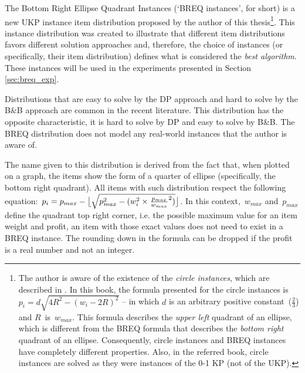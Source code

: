 The Bottom Right Ellipse Quadrant Instances (`BREQ instances', for short) is a new UKP instance item distribution proposed by the author of this thesis\footnote{The author is aware of the existence of the \emph{circle instances}, which are described in \cite[p. 158]{book_ukp_2004}. In this book, the formula presented for the circle instances is \(p_i = d\sqrt{4R^2 - (w_i - 2R)^2}\) -- in which \(d\) is an arbitrary positive constant~(\(\frac{2}{3}\)) and \(R\)~is~\(w_{max}\). This formula describes the \emph{upper left} quadrant of an ellipse, which is different from the BREQ formula that describes the \emph{bottom right} quadrant of an ellipse. Consequently, circle instances and BREQ instances have completely different properties. Also, in the referred book, circle instances are solved as they were instances of the 0-1 KP (not of the UKP).}.
This instance distribution was created to illustrate that different item distributions favors different solution approaches and, therefore, the choice of instances (or specifically, their item distribution) defines what is considered the \emph{best algorithm}.
These instances will be used in the experiments presented in Section \ref{sec:breq_exp}.

Distributions that are easy to solve by the DP approach and hard to solve by the B\&B approach are common in the recent literature.
This distribution has the opposite characteristic, it is hard to solve by DP and easy to solve by B\&B.
The BREQ distribution does not model any real-world instances that the author is aware of.

The name given to this distribution is derived from the fact that, when plotted on a graph, the items show the form of a quarter of ellipse (specifically, the bottom right quadrant).
All items with such distribution respect the following equation:~\(p_i = p_{max} - \floor[\big]{\sqrt{p_{max}^2 - (w_i^2 \times \frac{p_{max}}{w_{max}}^2)}}\).
In this context,~\(w_{max}\) and~\(p_{max}\) define the quadrant top right corner, i.e. the possible maximum value for an item weight and profit, an item with those exact values does not need to exist in a BREQ instance.
The rounding down in the formula can be dropped if the profit is a real number and not an integer.

